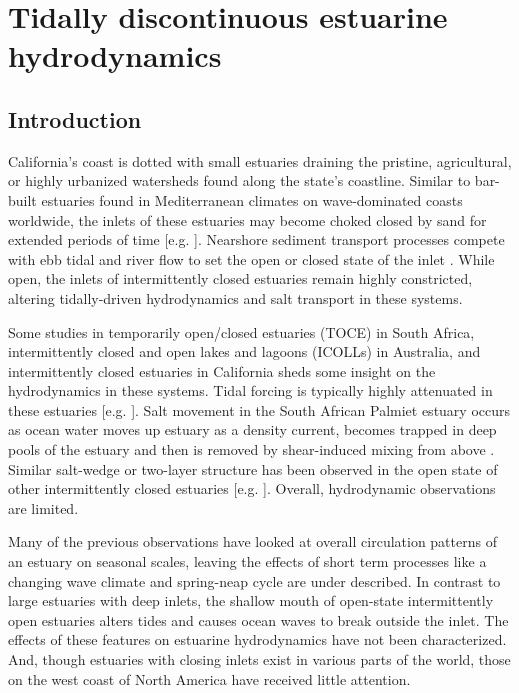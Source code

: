 \chapter{Tidally discontinuous estuarine hydrodynamics}
\label{ch3}




\section{Introduction}

California's coast is dotted with small estuaries draining the pristine,
agricultural, or highly urbanized watersheds found along the state's
coastline. Similar to bar-built estuaries found in Mediterranean climates
on wave-dominated coasts worldwide, the inlets of these estuaries
may become choked closed by sand for extended periods of time {[}e.g.
\parencite{elwany_opening_1998,hanes_waves_2011,fortunato_morphological_2014,ranasinghe_seasonal_2003}{]}.
Nearshore sediment transport processes compete with ebb tidal and
river flow to set the open or closed state of the inlet \parencite{behrens_episodic_2013}.
While open, the inlets of intermittently closed estuaries remain highly
constricted, altering tidally-driven hydrodynamics and salt transport
in these systems.

Some studies in temporarily open/closed estuaries (TOCE) in South
Africa, intermittently closed and open lakes and lagoons (ICOLLs)
in Australia, and intermittently closed estuaries in California sheds
some insight on the hydrodynamics in these systems. Tidal forcing
is typically highly attenuated in these estuaries {[}e.g. \parencite{ranasinghe_circulation_1999,gale_processes_2007}{]}.
Salt movement in the South African Palmiet estuary occurs as ocean
water moves up estuary as a density current, becomes trapped in deep
pools of the estuary and then is removed by shear-induced mixing from
above \parencite{largier_dynamics_1991}. Similar salt-wedge or two-layer
structure has been observed in the open state of other intermittently
closed estuaries {[}e.g. \parencite{sharples_quantifying_2003}{]}. Overall,
hydrodynamic observations are limited.

Many of the previous observations have looked at overall circulation
patterns of an estuary on seasonal scales, leaving the effects of
short term processes like a changing wave climate and spring-neap
cycle are under described. In contrast to large estuaries with deep
inlets, the shallow mouth of open-state intermittently open estuaries
alters tides and causes ocean waves to break outside the inlet. The
effects of these features on estuarine hydrodynamics have not been
characterized. And, though estuaries with closing inlets exist in
various parts of the world, those on the west coast of North America
have received little attention. 

